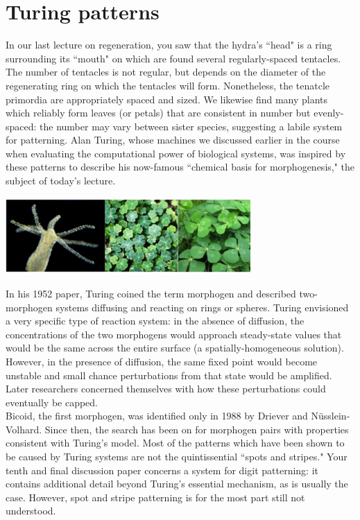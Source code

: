 \documentclass{article}
\begin{document}
\large

\section*{Turing patterns}

In our last lecture on regeneration, you saw that the hydra's ``head" is a ring surrounding its ``mouth" on which are found several regularly-spaced tentacles. The number of tentacles is not regular, but depends on the diameter of the regenerating ring on which the tentacles will form. Nonetheless, the tenatcle primordia are appropriately spaced and sized. We likewise find many plants which reliably form leaves (or petals) that are consistent in number but evenly-spaced: the number may vary between sister species, suggesting a labile system for patterning. Alan Turing, whose machines we discussed earlier in the course when evaluating the computational power of biological systems, was inspired by these patterns to describe his now-famous ``chemical basis for morphogenesis," the subject of today's lecture.

\begin{center}
\includegraphics[width=0.7\textwidth]{hydra_leaves.pdf}
\end{center}

In his 1952 paper, Turing coined the term morphogen and described two-morphogen systems diffusing and reacting on rings or spheres. Turing envisioned a very specific type of reaction system: in the absence of diffusion, the concentrations of the two morphogens would approach steady-state values that would be the same across the entire surface (a spatially-homogeneous solution). However, in the presence of diffusion, the same fixed point would become unstable and small chance perturbations from that state would be amplified. Later researchers concerned themselves with how these perturbations could eventually be capped.\\

Bicoid, the first morphogen, was identified only in 1988 by Driever and N\"{u}sslein-Volhard. Since then, the search has been on for morphogen pairs with properties consistent with Turing's model. Most of the patterns which have been shown to be caused by Turing systems are not the quintissential ``spots and stripes." Your tenth and final discussion paper concerns a system for digit patterning: it contains additional detail beyond Turing's essential mechanism, as is usually the case. However, spot and stripe patterning is for the most part still not understood.
\end{document}
